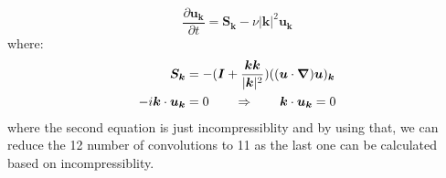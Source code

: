 \documentclass[10pt]{article}
\begin{document}
%
\begin{equation}
\frac{\partial {\bm{u}}_{\bm{k}}}{\partial t} = {\bm{S}}_{\bm{k}} -\nu{|\bm{k}|}^2{\bm{u}}_{\bm{k}}
\end{equation}
where:
%
\begin{align}
\bm{S}_{\bm{k}}&=-(\bm{I} + \frac{\bm{kk}}{|\bm{k}|^2})((\bm{u}\cdot\bm{\nabla})\bm{u})_{\bm{k}} \notag \\
-i\bm{k}\cdot{\bm{u}}_{\bm{k}}&=0 \qquad\Rightarrow\qquad \bm{k}\cdot{\bm{u}}_{\bm{k}}=0
\end{align}
%
where the second equation is just incompressiblity  and by using that, we can reduce the 12 number of convolutions to 11 as the last one can be calculated based on incompressiblity.
\end{document}
